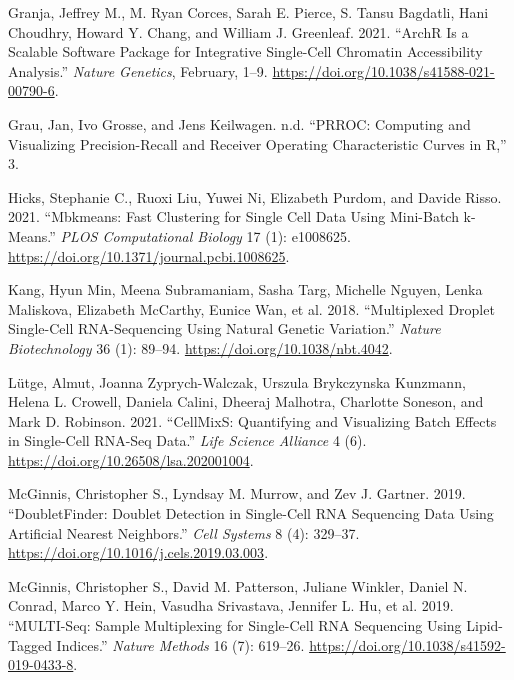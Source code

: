 \documentclass[10pt,a4paper,twocolumn]{article}
\begin{document}
\begin{CSLReferences}{1}{0}
\leavevmode\hypertarget{ref-granjaArchRScalableSoftware2021}{}%
Granja, Jeffrey M., M. Ryan Corces, Sarah E. Pierce, S. Tansu Bagdatli, Hani Choudhry, Howard Y. Chang, and William J. Greenleaf. 2021. {``ArchR Is a Scalable Software Package for Integrative Single-Cell Chromatin Accessibility Analysis.''} \emph{Nature Genetics}, February, 1--9. \url{https://doi.org/10.1038/s41588-021-00790-6}.

\leavevmode\hypertarget{ref-grauPRROCComputingVisualizing}{}%
Grau, Jan, Ivo Grosse, and Jens Keilwagen. n.d. {``PRROC: Computing and Visualizing Precision-Recall and Receiver Operating Characteristic Curves in R,''} 3.

\leavevmode\hypertarget{ref-hicksMbkmeansFastClustering2021}{}%
Hicks, Stephanie C., Ruoxi Liu, Yuwei Ni, Elizabeth Purdom, and Davide Risso. 2021. {``Mbkmeans: Fast Clustering for Single Cell Data Using Mini-Batch k-Means.''} \emph{PLOS Computational Biology} 17 (1): e1008625. \url{https://doi.org/10.1371/journal.pcbi.1008625}.

\leavevmode\hypertarget{ref-kangMultiplexedDropletSinglecell2018}{}%
Kang, Hyun Min, Meena Subramaniam, Sasha Targ, Michelle Nguyen, Lenka Maliskova, Elizabeth McCarthy, Eunice Wan, et al. 2018. {``Multiplexed Droplet Single-Cell RNA-Sequencing Using Natural Genetic Variation.''} \emph{Nature Biotechnology} 36 (1): 89--94. \url{https://doi.org/10.1038/nbt.4042}.

\leavevmode\hypertarget{ref-lutgeCellMixSQuantifyingVisualizing2021}{}%
Lütge, Almut, Joanna Zyprych-Walczak, Urszula Brykczynska Kunzmann, Helena L. Crowell, Daniela Calini, Dheeraj Malhotra, Charlotte Soneson, and Mark D. Robinson. 2021. {``CellMixS: Quantifying and Visualizing Batch Effects in Single-Cell RNA-Seq Data.''} \emph{Life Science Alliance} 4 (6). \url{https://doi.org/10.26508/lsa.202001004}.

\leavevmode\hypertarget{ref-mcginnisDoubletFinderDoubletDetection2019}{}%
McGinnis, Christopher S., Lyndsay M. Murrow, and Zev J. Gartner. 2019. {``DoubletFinder: Doublet Detection in Single-Cell RNA Sequencing Data Using Artificial Nearest Neighbors.''} \emph{Cell Systems} 8 (4): 329--37. \url{https://doi.org/10.1016/j.cels.2019.03.003}.

\leavevmode\hypertarget{ref-mcginnisMULTIseqSampleMultiplexing2019}{}%
McGinnis, Christopher S., David M. Patterson, Juliane Winkler, Daniel N. Conrad, Marco Y. Hein, Vasudha Srivastava, Jennifer L. Hu, et al. 2019. {``MULTI-Seq: Sample Multiplexing for Single-Cell RNA Sequencing Using Lipid-Tagged Indices.''} \emph{Nature Methods} 16 (7): 619--26. \url{https://doi.org/10.1038/s41592-019-0433-8}.


\end{CSLReferences}
\end{document}

